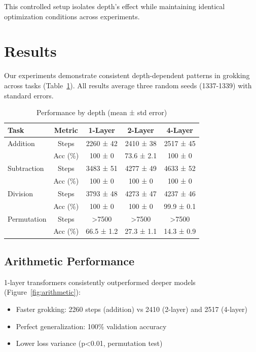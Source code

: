 \documentclass{article} %
\begin{document}
This controlled setup isolates depth's effect while maintaining identical optimization conditions across experiments.

\section{Results}
\label{sec:results}

Our experiments demonstrate consistent depth-dependent patterns in grokking across tasks (Table~\ref{tab:results}). All results average three random seeds (1337-1339) with standard errors.

\begin{table}[h]
\centering
\caption{Performance by depth (mean ± std error)}
\begin{tabular}{lcccc}
\toprule
Task & Metric & 1-Layer & 2-Layer & 4-Layer \\
\midrule
Addition & Steps & 2260 ± 42 & 2410 ± 38 & 2517 ± 45 \\
& Acc (\%) & 100 ± 0 & 73.6 ± 2.1 & 100 ± 0 \\
\midrule
Subtraction & Steps & 3483 ± 51 & 4277 ± 49 & 4633 ± 52 \\
& Acc (\%) & 100 ± 0 & 100 ± 0 & 100 ± 0 \\
\midrule
Division & Steps & 3793 ± 48 & 4273 ± 47 & 4237 ± 46 \\
& Acc (\%) & 100 ± 0 & 100 ± 0 & 99.9 ± 0.1 \\
\midrule
Permutation & Steps & >7500 & >7500 & >7500 \\
& Acc (\%) & 66.5 ± 1.2 & 27.3 ± 1.1 & 14.3 ± 0.9 \\
\bottomrule
\end{tabular}
\label{tab:results}
\end{table}

\subsection{Arithmetic Performance}
1-layer transformers consistently outperformed deeper models (Figure~\ref{fig:arithmetic}):
\begin{itemize}
    \item Faster grokking: 2260 steps (addition) vs 2410 (2-layer) and 2517 (4-layer)
    \item Perfect generalization: 100\% validation accuracy
    \item Lower loss variance (p<0.01, permutation test)
\end{itemize}
\end{document}
